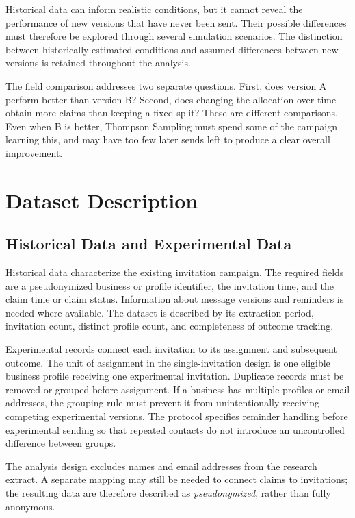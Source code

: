 Historical data can inform realistic conditions, but it cannot reveal the performance of new versions that have never been sent. Their possible differences must therefore be explored through several simulation scenarios. The distinction between historically estimated conditions and assumed differences between new versions is retained throughout the analysis.

The field comparison addresses two separate questions. First, does version A perform better than version B? Second, does changing the allocation over time obtain more claims than keeping a fixed split? These are different comparisons. Even when B is better, Thompson Sampling must spend some of the campaign learning this, and may have too few later sends left to produce a clear overall improvement.

\section{Dataset Description}
\label{sec:method_data}

\subsection{Historical Data and Experimental Data}

Historical data characterize the existing invitation campaign. The required fields are a pseudonymized business or profile identifier, the invitation time, and the claim time or claim status. Information about message versions and reminders is needed where available. The dataset is described by its extraction period, invitation count, distinct profile count, and completeness of outcome tracking.

Experimental records connect each invitation to its assignment and subsequent outcome. The unit of assignment in the single-invitation design is one eligible business profile receiving one experimental invitation. Duplicate records must be removed or grouped before assignment. If a business has multiple profiles or email addresses, the grouping rule must prevent it from unintentionally receiving competing experimental versions. The protocol specifies reminder handling before experimental sending so that repeated contacts do not introduce an uncontrolled difference between groups.

The analysis design excludes names and email addresses from the research extract. A separate mapping may still be needed to connect claims to invitations; the resulting data are therefore described as \emph{pseudonymized}, rather than fully anonymous.

